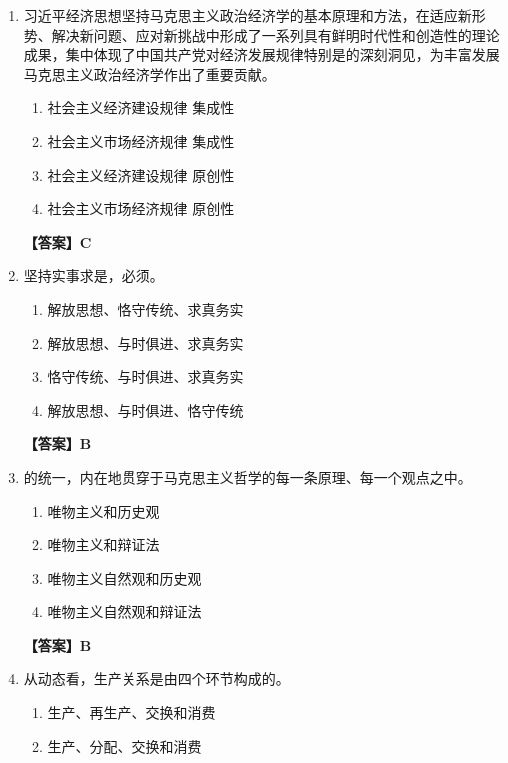 \documentclass[UTF8,11pt,a4paper]{ctexart}
\begin{document}
\begin{enumerate}[label=\textbf{\arabic*.}, leftmargin=2.5em, itemsep=0.7em]
\item 习近平经济思想坚持马克思主义政治经济学的基本原理和方法，在适应新形势、解决新问题、应对新挑战中形成了一系列具有鲜明时代性和创造性的理论成果，集中体现了中国共产党对经济发展规律特别是\allowbreak\underline{\hspace{4em}}的深刻洞见，为丰富发展马克思主义政治经济学作出了重要\allowbreak\underline{\hspace{4em}}贡献。
\begin{enumerate}[label=\Alph*., leftmargin=2em, itemsep=0.1em, topsep=0.15em]
\item 社会主义经济建设规律 集成性
\item 社会主义市场经济规律 集成性
\item 社会主义经济建设规律 原创性
\item 社会主义市场经济规律 原创性
\end{enumerate}
\textbf{【答案】C}
\item 坚持实事求是，必须\allowbreak\underline{\hspace{4em}}。
\begin{enumerate}[label=\Alph*., leftmargin=2em, itemsep=0.1em, topsep=0.15em]
\item 解放思想、恪守传统、求真务实
\item 解放思想、与时俱进、求真务实
\item 恪守传统、与时俱进、求真务实
\item 解放思想、与时俱进、恪守传统
\end{enumerate}
\textbf{【答案】B}
\item \allowbreak\underline{\hspace{4em}}的统一，内在地贯穿于马克思主义哲学的每一条原理、每一个观点之中。
\begin{enumerate}[label=\Alph*., leftmargin=2em, itemsep=0.1em, topsep=0.15em]
\item 唯物主义和历史观
\item 唯物主义和辩证法
\item 唯物主义自然观和历史观
\item 唯物主义自然观和辩证法
\end{enumerate}
\textbf{【答案】B}
\item 从动态看，生产关系是由\allowbreak\underline{\hspace{4em}}四个环节构成的。
\begin{enumerate}[label=\Alph*., leftmargin=2em, itemsep=0.1em, topsep=0.15em]
\item 生产、再生产、交换和消费
\item 生产、分配、交换和消费

\end{enumerate}
\end{enumerate}
\end{document}
